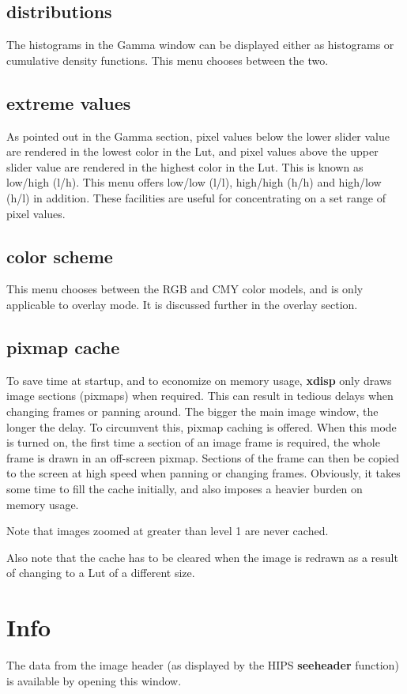 \subsection{distributions}
The histograms in the Gamma window can be displayed either as histograms or cumulative density functions. This menu chooses between the two.

\subsection{extreme values}
As pointed out in the Gamma section, pixel values below the lower slider value are rendered in the lowest color in the Lut, and pixel values above the upper slider value are rendered in the highest color in the Lut. This is known as low/high (l/h). This menu offers low/low (l/l), high/high (h/h) and high/low (h/l) in addition. These facilities are useful for concentrating on a set range of pixel values.

\subsection{color scheme}
This menu chooses between the RGB and CMY color models, and is only applicable to overlay mode. It is discussed further in the overlay section.

\subsection{pixmap cache}
To save time at startup, and to economize on memory usage, {\bf xdisp} only draws image sections (pixmaps) when required. This can result in tedious delays when changing frames or panning around. The bigger the main image window, the longer the delay. To circumvent this, pixmap caching is offered. When this mode is turned on, the first time a section of an image frame is required, the whole frame is drawn in an off-screen pixmap. Sections of the frame can then be copied to the screen at high speed when panning or changing frames. Obviously, it takes some time to fill the cache initially, and also imposes a heavier burden on memory usage.

Note that images zoomed at greater than level 1 are never cached.

Also note that the cache has to be cleared when the image is redrawn as a result of changing to a Lut of a different size.

\section{Info}
The data from the image header (as displayed by the HIPS {\bf seeheader} function) is available by opening this window.

